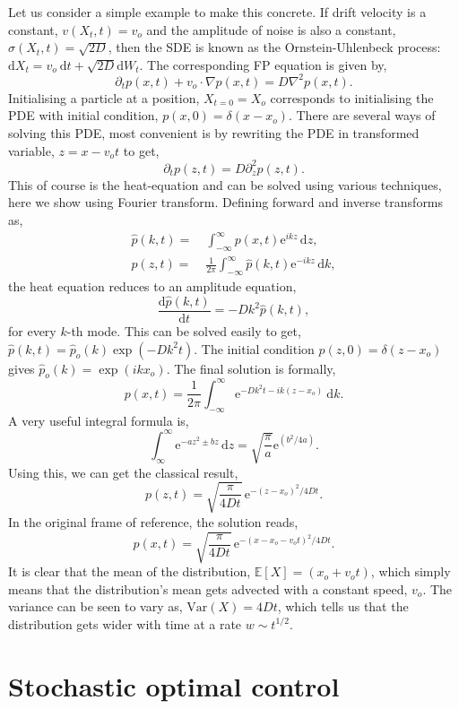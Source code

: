 \documentclass[11pt]{article}
\def\d{\mathrm{d}}
\def\e{\mathrm{e}}
\def\hp{\hat{p}}
\def\E{\mathbb{E}}
\def\d{\text{d}}
\def\grad{\vec{\nabla}}
\def\e{\text{e}}
\def\var{\mathrm{Var}}
\def\grad{\nabla}
\begin{document}
\begin{singlespace}
Let us consider a simple example to make this concrete. If drift velocity is a constant, $v(X_t, t) = v_o$ and the amplitude of noise is also a constant, $\sigma(X_t, t) = \sqrt{2D}$, then the SDE is known as the Ornstein-Uhlenbeck process: $\d X_t = v_o \ \d t + \sqrt{2D} \d W_t$. The corresponding FP equation is given by,
\begin{equation}
    \partial_t p(x, t) + v_o \cdot \grad p(x, t) = D\grad^2 p(x, t).
    \label{eq:OUFPP}
\end{equation}
Initialising a particle at a position, $X_{t=0} = X_o$ corresponds to initialising the PDE with initial condition, $p(x, 0) = \delta(x-x_o)$. There are several ways of solving this PDE, most convenient is by rewriting the PDE in transformed variable, $z = x - v_o t$ to get,
\[
\partial_t p(z, t) = D \partial_z^2 p(z, t).
\]
This of course is the heat-equation and can be solved using various techniques, here we show using Fourier transform. Defining forward and inverse transforms as,
\begin{align}
    \hp(k, t) =&\ \int_{-\infty}^{\infty} p(x, t) \e^{ikz}\,\d z,\\
    p(z, t) =&\ \frac{1}{2\pi} \int_{-\infty}^{\infty} \hp(k, t) \e^{-ikz}\,\d k,
\end{align}
the heat equation reduces to an amplitude equation,
\[
\frac{\d \hp(k, t)}{\d t} = -D k^2 \hp(k, t),
\]
for every $k$-th mode. This can be solved easily to get, $\hp(k, t) = \hp_o(k) \exp(-Dk^2t)$. The initial condition $p(z, 0) = \delta(z-x_o)$ gives $\hp_o(k) = \exp(ikx_o)$. The final solution is formally,
\[
p(x, t) =  \frac{1}{2\pi} \int_{-\infty}^{\infty} \e^{-Dk^2 t - ik(z-x_o)} \ \d k.
\]
A very useful integral formula is,
\[
\int_\infty^\infty \e^{-a z^2 \pm b z}\,\d z = \sqrt{\frac{\pi}{a}} \e^{(b^2/4a)}.
\]
Using this, we can get the classical result,
\[
p(z, t) = \sqrt{\frac{\pi}{4Dt}}\, \e^{-(z - x_o)^2/4 D t}.
\]
In the original frame of reference, the solution reads,
\[
p(x, t) = \sqrt{\frac{\pi}{4Dt}}\, \e^{-(x - x_o - v_o t)^2/4 D t}.
\]
It is clear that the mean of the distribution, $\E[X] = (x_o+v_o t)$, which simply means that the distribution's mean gets advected with a constant speed, $v_o$. The variance can be seen to vary as, $\var(X) = 4Dt$, which tells us that the distribution gets wider with time at a rate $w \sim t^{1/2}$.

\section{Stochastic optimal control}


\end{singlespace}
\end{document}
